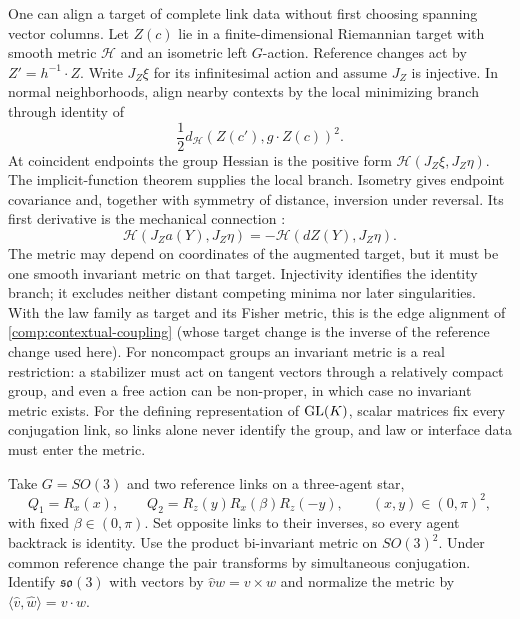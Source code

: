 One can align a target of complete link data without first choosing spanning vector columns. Let $Z(c)$ lie in a finite-dimensional Riemannian target with smooth metric $\mathcal H$ and an isometric left $G$-action. Reference changes act by $Z'=h^{-1}\cdot Z$. Write $J_Z\xi$ for its infinitesimal action and assume $J_Z$ is injective. In normal neighborhoods, align nearby contexts by the local minimizing branch through identity of
\begin{equation}
\frac12d_{\mathcal H}(Z(c'),g\cdot Z(c))^2.
\end{equation}
At coincident endpoints the group Hessian is the positive form $\mathcal H(J_Z\xi,J_Z\eta)$. The implicit-function theorem supplies the local branch. Isometry gives endpoint covariance and, together with symmetry of distance, inversion under reversal. Its first derivative is the mechanical connection \citep{LittlejohnReinsch1997}:
\begin{equation}
\mathcal H(J_Za(Y),J_Z\eta)=-\mathcal H(dZ(Y),J_Z\eta).
\label{comp:ibt:alignment}
\end{equation}
The metric may depend on coordinates of the augmented target, but it must be one smooth invariant metric on that target. Injectivity identifies the identity branch; it excludes neither distant competing minima nor later singularities. With the law family as target and its Fisher metric, this is the edge alignment of \cref{comp:contextual-coupling} (whose target change is the inverse of the reference change used here). For noncompact groups an invariant metric is a real restriction: a stabilizer must act on tangent vectors through a relatively compact group, and even a free action can be non-proper, in which case no invariant metric exists. For the defining representation of $\mathrm{GL}(K)$, scalar matrices fix every conjugation link, so links alone never identify the group, and law or interface data must enter the metric.

Take $G=SO(3)$ and two reference links on a three-agent star,
\begin{equation}
Q_1=R_x(x),\qquad Q_2=R_z(y)R_x(\beta)R_z(-y),
\qquad (x,y)\in(0,\pi)^2,
\end{equation}
with fixed $\beta\in(0,\pi)$. Set opposite links to their inverses, so every agent backtrack is identity. Use the product bi-invariant metric on $SO(3)^2$. Under common reference change the pair transforms by simultaneous conjugation. Identify $\mathfrak{so}(3)$ with vectors by $\widehat v w=v\times w$ and normalize the metric by $\langle\widehat v,\widehat w\rangle=v\cdot w$.

